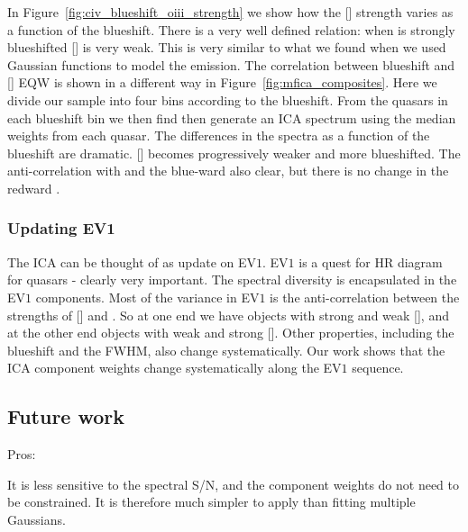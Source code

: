 In Figure~\ref{fig:civ_blueshift_oiii_strength} we show how the [] strength varies as a function of the  blueshift. 
There is a very well defined relation: when  is strongly blueshifted [] is very weak. 
This is very similar to what we found when we used Gaussian functions to model the emission. 
The correlation between  blueshift and [] EQW is shown in a different way in Figure~\ref{fig:mfica_composites}. 
Here we divide our sample into four bins according to the  blueshift. 
From the quasars in each  blueshift bin we then find then generate an ICA spectrum using the median weights from each quasar. 
The differences in the spectra as a function of the  blueshift are dramatic. 
[] becomes progressively weaker and more blueshifted.
The anti-correlation with  and the blue-ward  also clear, but there is no change in the redward . 

\subsubsection{Updating EV1}

The ICA can be thought of as update on EV$1$.
EV$1$ is a quest for HR diagram for quasars - clearly very important.  
The spectral diversity is encapsulated in the EV$1$ components. 
Most of the variance in EV$1$ is the anti-correlation between the strengths of [] and . 
So at one end we have objects with strong  and weak [], and at the other end objects with weak  and strong []. 
Other properties, including the  blueshift and the \hb FWHM, also change systematically. 
Our work shows that the ICA component weights change systematically along the EV$1$ sequence. 



\subsection{Future work}

Pros:

It is less sensitive to the spectral S/N, and the component weights do not need to be constrained. 
It is therefore much simpler to apply than fitting multiple Gaussians. 

